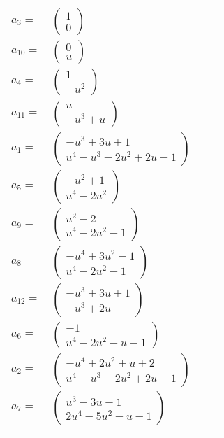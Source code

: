 \documentclass[1p]{elsarticle_modified}
\theoremstyle{definition}
\begin{document}
\begin{tabular}{m{7pt} m{180pt} m{7pt} m{180pt} }
\flushright $a_{3}=$&$\begin{pmatrix}1\\0\end{pmatrix}$ \\
\flushright $a_{10}=$&$\begin{pmatrix}0\\u\end{pmatrix}$ \\
\flushright $a_{4}=$&$\begin{pmatrix}1\\- u^2\end{pmatrix}$ \\
\flushright $a_{11}=$&$\begin{pmatrix}u\\- u^3+u\end{pmatrix}$ \\
\flushright $a_{1}=$&$\begin{pmatrix}- u^3+3 u+1\\u^4- u^3-2 u^2+2 u-1\end{pmatrix}$ \\
\flushright $a_{5}=$&$\begin{pmatrix}- u^2+1\\u^4-2 u^2\end{pmatrix}$ \\
\flushright $a_{9}=$&$\begin{pmatrix}u^2-2\\u^4-2 u^2-1\end{pmatrix}$ \\
\flushright $a_{8}=$&$\begin{pmatrix}- u^4+3 u^2-1\\u^4-2 u^2-1\end{pmatrix}$ \\
\flushright $a_{12}=$&$\begin{pmatrix}- u^3+3 u+1\\- u^3+2 u\end{pmatrix}$ \\
\flushright $a_{6}=$&$\begin{pmatrix}-1\\u^4-2 u^2- u-1\end{pmatrix}$ \\
\flushright $a_{2}=$&$\begin{pmatrix}- u^4+2 u^2+u+2\\u^4- u^3-2 u^2+2 u-1\end{pmatrix}$ \\
\flushright $a_{7}=$&$\begin{pmatrix}u^3-3 u-1\\2 u^4-5 u^2- u-1\end{pmatrix}$\\&\end{tabular}
\end{document}
